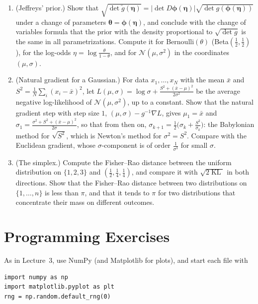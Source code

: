 \documentclass[11pt]{article}
\theoremstyle{definition}
\theoremstyle{plain}
\theoremstyle{remark}
\DeclareMathOperator{\KL}{KL}
\begin{document}
\begin{enumerate}[leftmargin=*]
    \item\label{exer:jeffreys} (Jeffreys' prior.) Show that $\sqrt{\det\tilde g(\boldsymbol{\eta})} = |\det D\boldsymbol{\phi}(\boldsymbol{\eta})|\sqrt{\det g(\boldsymbol{\phi}(\boldsymbol{\eta}))}$ under a change of parameters $\boldsymbol{\theta} = \boldsymbol{\phi}(\boldsymbol{\eta})$, and conclude with the change of variables formula that the prior with the density proportional to $\sqrt{\det g}$ is the same in all parametrizations. Compute it for Bernoulli$(\theta)$ (Beta$(\frac{1}{2}, \frac{1}{2})$), for the log-odds $\eta = \log\frac{\theta}{1 - \theta}$, and for $\mathcal{N}(\mu, \sigma^2)$ in the coordinates $(\mu, \sigma)$.
    \item\label{exer:natural-gaussian} (Natural gradient for a Gaussian.) For data $x_1, \ldots, x_N$ with the mean $\bar x$ and $S^2 = \frac{1}{N}\sum_i (x_i - \bar x)^2$, let $L(\mu, \sigma) = \log\sigma + \frac{S^2 + (\bar x - \mu)^2}{2\sigma^2}$ be the average negative log-likelihood of $\mathcal{N}(\mu, \sigma^2)$, up to a constant. Show that the natural gradient step with step size $1$, $(\mu, \sigma) - g^{-1}\nabla L$, gives $\mu_1 = \bar x$ and $\sigma_1 = \frac{\sigma^2 + S^2 + (\bar x - \mu)^2}{2\sigma}$, so that from then on, $\sigma_{k+1} = \frac{1}{2}\big(\sigma_k + \frac{S^2}{\sigma_k}\big)$: the Babylonian method for $\sqrt{S^2}$, which is Newton's method for $\sigma^2 = S^2$. Compare with the Euclidean gradient, whose $\sigma$-component is of order $\frac{1}{\sigma^3}$ for small $\sigma$.
    \item (The simplex.) Compute the Fisher--Rao distance between the uniform distribution on $\{1, 2, 3\}$ and $(\frac{1}{2}, \frac{1}{4}, \frac{1}{4})$, and compare it with $\sqrt{2\KL}$ in both directions. Show that the Fisher--Rao distance between two distributions on $\{1, \ldots, n\}$ is less than $\pi$, and that it tends to $\pi$ for two distributions that concentrate their mass on different outcomes.
\end{enumerate}

\section*{Programming Exercises}

\setlength{\emergencystretch}{3em}

As in Lecture~3, use NumPy (and Matplotlib for plots), and start each file with
\begin{lstlisting}
import numpy as np
import matplotlib.pyplot as plt
rng = np.random.default_rng(0)
\end{lstlisting}
\end{document}
